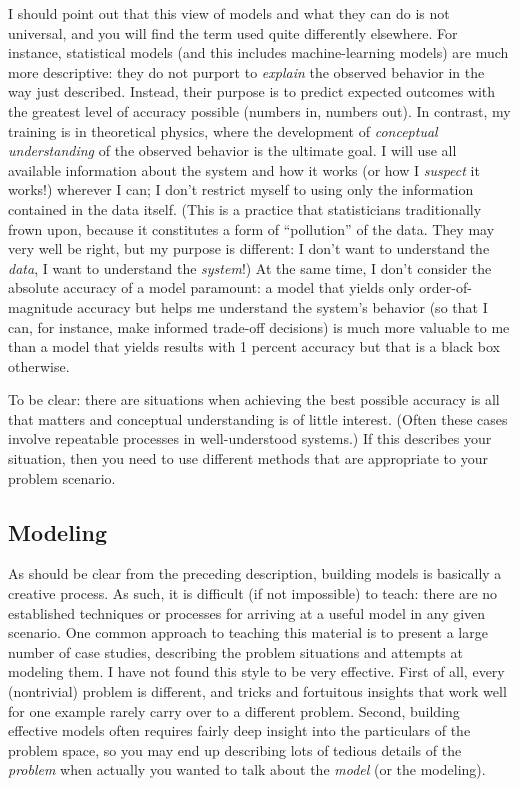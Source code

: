 I should point out that this view of models and what they can do is
not universal, and you will find the term used quite differently
elsewhere. For instance, statistical models (and this includes
machine-learning models) are much more descriptive: they do not
purport to \emph{explain} the observed behavior in the way just
described. Instead, their purpose is to predict expected outcomes\vadjust{\pagebreak} with
the greatest level of accuracy possible (numbers in, numbers out).  In
contrast, my training is in theoretical physics, where the development
of \emph{conceptual understanding} of the observed behavior is the
ultimate goal. I will use all available information about the system
and how it works (or how I \emph{suspect} it works!)  wherever I can;
I don't restrict myself to using only the information contained in the
data itself.  (This is a practice that statisticians traditionally
frown upon, because it constitutes a form of ``pollution'' of the
data. They may very well be right, but my purpose is different: I
don't want to understand the \emph{data}, I want to understand the
\emph{system}!) At the same time, I don't consider the absolute
accuracy of a model paramount: a model that yields only
order-of-magnitude accuracy but helps me understand the system's
behavior (so that I can, for instance, make informed trade-off
decisions) is much more valuable to me than a model that yields
results with 1 percent accuracy but that is a black box otherwise.

To be clear: there are situations when achieving the best possible
accuracy is all that matters and conceptual understanding is of little
interest. (Often these cases involve repeatable processes in
well-understood systems.) If this describes your situation, then you
need to use different methods that are appropriate to your problem
scenario.


\subsection{Modeling}

As should be clear from the preceding description, building models is
basically a creative process. As such, it is difficult (if not impossible)
to teach: there are no established techniques or processes for
arriving at a useful model in any given scenario. One common approach
to teaching this material is to present a large number of case
studies, describing the problem situations and attempts at modeling
them. I have not found this style to be very effective. First of all,
every (nontrivial) problem is different, and tricks and fortuitous
insights that work well for one example rarely carry over to a
different problem. Second, building effective models often requires
fairly deep insight into the particulars of the problem space, so you
may end up describing lots of tedious details of the \emph{problem}
when actually you wanted to talk about the \emph{model} (or the
modeling).

